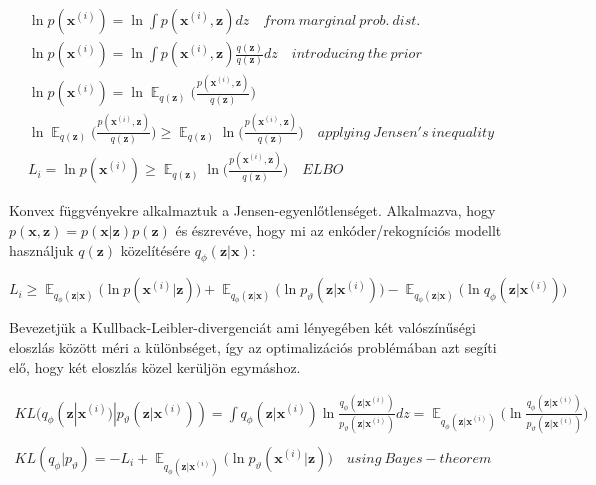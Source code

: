 \documentclass[12pt, english]{article}
\DeclareMathOperator*{\E}{\mathbb{E}}
\begin{document}
\vspace{4mm}

\begin{gather}
    \ln p(\bm{x}^{(i)}) = \ln\int p(\bm{x}^{(i)}, \bm{z})dz \quad from\ marginal\ prob.\ dist.\\
    \ln p(\bm{x}^{(i)}) = \ln\int p(\bm{x}^{(i)}, \bm{z})\frac{q(\bm{z})}{q(\bm{z})}dz \quad introducing\ the\ prior \\
    \ln p(\bm{x}^{(i)}) = \ln \E_{q(\bm{z})} \Big( \frac{p(\bm{x}^{(i)}, \bm{z})}{q(\bm{z})}\Big) \\
    \ln \E_{q(\bm{z})} \Big( \frac{p(\bm{x}^{(i)}, \bm{z})}{q(\bm{z})}\Big) \geq \E_{q(\bm{z})} \ln\Big( \frac{p(\bm{x}^{(i)}, \bm{z})}{q(\bm{z})}\Big) \quad applying\ Jensen's\ inequality \\
    L_{i} = \ln p(\bm{x}^{(i)}) \geq \E_{q(\bm{z})} \ln\Big( \frac{p(\bm{x}^{(i)}, \bm{z})}{q(\bm{z})}\Big) \quad ELBO
\end{gather}

\vspace{4mm}

\par Konvex függvényekre alkalmaztuk a Jensen-egyenlőtlenséget. Alkalmazva, hogy $p(\bm{x}, \bm{z}) = p(\bm{x} | \bm{z})p(\bm{z})$ és észrevéve, hogy mi az enkóder/rekogníciós modellt használjuk $q(\bm{z})$ közelítésére $q_{\phi}(\bm{z} | \bm{x})$:

\vspace{4mm}

\begin{equation}
    L_{i} \geq \E_{q_{\phi}(\bm{z} | \bm{x})} \Big( \ln p(\bm{x}^{(i)} | \bm{z}) \Big) + \E_{q_{\phi}(\bm{z} | \bm{x})} \Big( \ln p_{\vartheta}(\bm{z} | \bm{x}^{(i)}) \Big) - \E_{q_{\phi}(\bm{z} | \bm{x})} \Big( \ln q_{\phi}(\bm{z} | \bm{x}^{(i)}) \Big)
\end{equation}

\vspace{4mm}

\par Bevezetjük a Kullback-Leibler-divergenciát ami lényegében két valószínűségi eloszlás között méri a különbséget, így az optimalizációs problémában azt segíti elő, hogy két eloszlás közel kerüljön egymáshoz.

\vspace{4mm}

\begin{gather*}
    KL(q_{\phi}(\bm{z} | \bm{x}^{(i)}) | p_{\vartheta}(\bm{z} | \bm{x}^{(i)})) = \int q_{\phi}(\bm{z} | \bm{x}^{(i)})\ln \frac{q_{\phi}(\bm{z} | \bm{x}^{(i)})}{p_{\vartheta}(\bm{z} | \bm{x}^{(i)})}dz = \E_{q_{\phi}(\bm{z} | \bm{x}^{(i)})} \Big( \ln \frac{q_{\phi}(\bm{z} | \bm{x}^{(i)})}{p_{\vartheta}(\bm{z}|\bm{x}^{(i)})}  \Big) \\ \\
    KL(q_{\phi} | p_{\vartheta}) = -L_{i} + \E_{q_{\phi}(\bm{z} | \bm{x}^{(i)})} \Big( \ln p_{\vartheta}(\bm{x}^{(i)} | \bm{z}) \Big) \quad using\ Bayes-theorem
\end{gather*}
\end{document}
